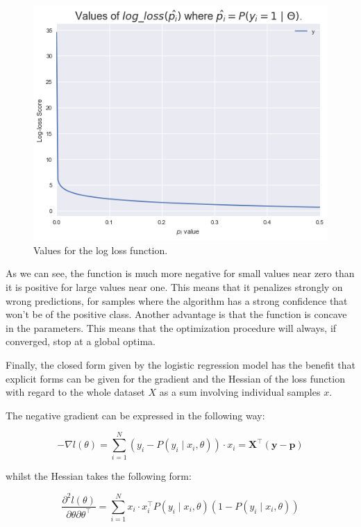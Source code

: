 \begin{figure}[h!]
\begin{center}
\includegraphics[width=0.7\columnwidth]{figures/logloss/figure-logLossValues.png}
\caption{ Values for the log loss function.}
\label{figure-logLossValues}
\end{center}
\end{figure}

As we can see, the function is much more negative for small values near zero than it is positive for large values near one. This means that it penalizes strongly on wrong predictions, for samples where the algorithm has a strong confidence that won't be of the positive class. Another advantage is that the function is concave in the parameters. This means that the optimization procedure will always, if converged, stop at a global optima.

Finally, the closed form given by the logistic regression model has the benefit that explicit forms can be given for the gradient and the Hessian of the loss function with regard to the whole dataset $X$ as a sum involving individual samples $x$.

The negative gradient can be expressed in the following way: %

\begin{equation}\label{eq:logitHessian}
- \nabla l(\theta) = \sum_{i=1}^N (y_i - P(y_i \mid x_i,\theta))\cdot x_i = \textbf{X}^{\intercal}(\textbf{y}-\textbf{p})
\end{equation}

whilst the Hessian takes the following form:

\begin{equation}\label{eq:logitHessian}
\frac{\partial^2 l(\theta)}{\partial \theta \partial \theta^\intercal} = \sum_{i=1}^N x_i \cdot x_i^\intercal P(y_i \mid x_i,\theta)(1 -P(y_i \mid x_i,\theta))
\end{equation}

